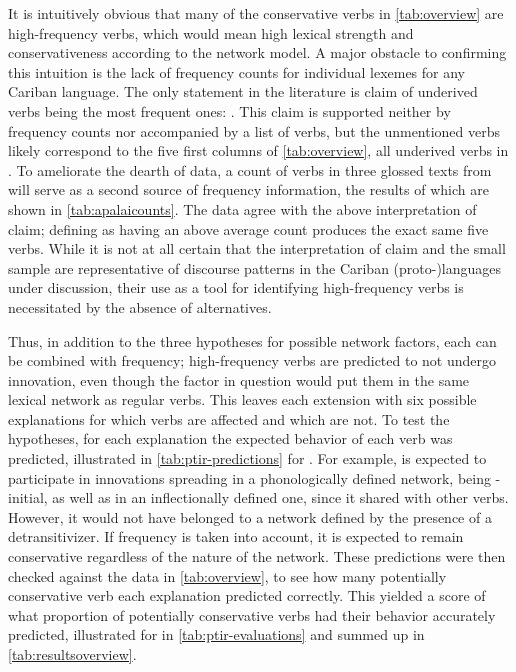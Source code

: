 It is intuitively obvious that many of the conservative verbs in \cref{tab:overview} are high-frequency verbs, which would mean high lexical strength and conservativeness according to the network model.
A major obstacle to confirming this intuition is the lack of frequency counts for individual lexemes for any Cariban language.
The only statement in the literature is  claim of \kalina underived  verbs being the most frequent ones: .
This claim is supported neither by frequency counts nor accompanied by a list of verbs, but the unmentioned verbs likely correspond to the five first columns of \cref{tab:overview}, all underived  verbs in \kalina.
To ameliorate the dearth of data, a count of  verbs in three glossed texts from \textcite{koehns1994textos} will serve as a second source of frequency information, the results of which are shown in \cref{tab:apalaicounts}.
The \apalai data agree with the above interpretation of  claim; defining  as having an above average count produces the exact same five verbs.
While it is not at all certain that the interpretation of  claim and the small \apalai sample are representative of discourse patterns in the Cariban (proto-)languages under discussion, their use as a tool for identifying high-frequency verbs is necessitated by the absence of alternatives.




Thus, in addition to the three hypotheses for possible network factors, each can be combined with frequency; high-frequency verbs are predicted to not undergo innovation, even though the factor in question would put them in the same lexical network as regular  verbs.
This leaves each extension with six possible explanations for which verbs are affected and which are not.
To test the hypotheses, for each explanation the expected behavior of each verb was predicted, illustrated in \cref{tab:ptir-predictions} for \PTir.
For example,   is expected to participate in innovations spreading in a phonologically defined network, being -initial, as well as in an inflectionally defined one, since it shared  with other  verbs.
However, it would not have belonged to a network defined by the presence of a detransitivizer.
If frequency is taken into account, it is expected to remain conservative regardless of the nature of the network.
These predictions were then checked against the data in \cref{tab:overview}, to see how many potentially conservative verb each explanation predicted correctly.
This yielded a score of what proportion of potentially conservative verbs had their behavior accurately predicted, illustrated for \PTir in \cref{tab:ptir-evaluations} and summed up in \cref{tab:resultsoverview}.

